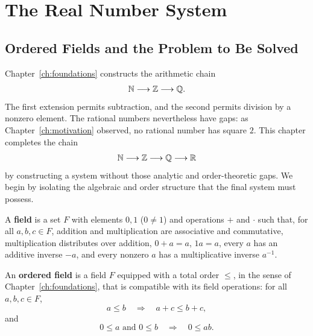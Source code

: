 \chapter{The Real Number System}
\label{ch:reals}

\section{Ordered Fields and the Problem to Be Solved}

Chapter~\ref{ch:foundations} constructs the arithmetic chain
\[
\mathbb{N}\longrightarrow\mathbb{Z}\longrightarrow\mathbb{Q}.
\]
The first extension permits subtraction, and the second permits division by a
nonzero element.  The rational numbers nevertheless have gaps: as
Chapter~\ref{ch:motivation} observed, no rational number has square \(2\).
This chapter completes the chain
\[
\mathbb{N}\longrightarrow\mathbb{Z}\longrightarrow\mathbb{Q}\longrightarrow\mathbb{R}
\]
by constructing a system without those analytic and order-theoretic gaps.
We begin by isolating the algebraic and order structure that the final system
must possess.

\begin{definition}[Field]
A \textbf{field} is a set $F$ with elements $0,1$ ($0\ne1$) and operations $+$ and $\cdot$ such that, for all $a,b,c\in F$, addition and multiplication are associative and commutative, multiplication distributes over addition, $0+a=a$, $1a=a$, every $a$ has an additive inverse $-a$, and every nonzero $a$ has a multiplicative inverse $a^{-1}$.
\end{definition}

\begin{definition}
An \textbf{ordered field} is a field $F$ equipped with a total order
\(\leq\), in the sense of Chapter~\ref{ch:foundations}, that is compatible
with its field operations: for all $a,b,c\in F$,
\[
a\leq b
\quad\Longrightarrow\quad
a+c\leq b+c,
\]
and
\[
0\leq a\text{ and }0\leq b
\quad\Longrightarrow\quad
0\leq ab.
\]
\end{definition}

